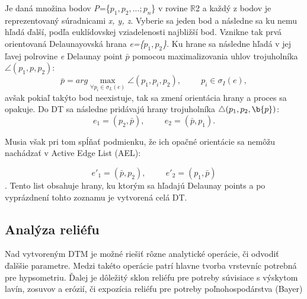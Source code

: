 \documentclass[12pt]{article}
\begin{document}
Je daná množina bodov \textit{P}=\{$p_1, p_2, ...; p_n$\} v rovine $\mathbb{R}$2 a každý z bodov je reprezentovaný súradnicami \textit{x, y, z}. Vyberie sa jeden bod a následne sa ku nemu hľadá ďalší, podľa euklídovskej vziadelenosti najbližší bod. Vznikne tak prvá orientovaná Delaunayovská hrana \textit{e=\{$p_1, p_2$\}}. Ku hrane sa následne hľadá v jej ľavej polrovine \textit{e} Delaunay point $\bar{p}$ pomocou maximalizovania uhlov trojuholníka $\angle(p_1, p, p_2)$:
$$\bar{p} = arg \max\limits_{\forall p_i \in \sigma_L  (e)} \angle(p_1, p_i, p_2),\hspace{1cm}  p_i \in \sigma_I(e),$$ avšak pokiaľ takýto bod neexistuje, tak sa zmení orientácia hrany a proces sa opakuje. Do DT sa následne pridávajú hrany trojuholníka \textit{$\triangle(p_1, p_2, \b{p})$}: 
$$e_1 = (p_2,\bar{p}),\hspace{1cm}  e_2 = (\bar{p}, p_1).$$ \par
 Musia však pri tom spĺňať podmienku, že ich opačné orientácie sa nemôžu nachádzať v Active Edge List (AEL):

$$ e'_1 = (\bar{p}, p_2),\hspace{1cm}  e'_2 = ( p_1, \bar{p})$$.
Tento list obsahuje hrany, ku ktorým sa hľadajú Delaunay points a po vyprázdnení tohto zoznamu je vytvorená celá DT.
\subsection*{Analýza reliéfu}
Nad vytvoreným DTM je možné riešiť rôzne analytické operácie, či odvodiť ďalššie parametre. Medzi takéto operácie patrí hlavne tvorba vrstevníc potrebná pre hypsometriu. Ďalej je dôležitý sklon reliéfu pre potreby súvisiace s výskytom lavín, zosuvov a erózií, či expozícia reliéfu pre potreby poľnohospodárstva (Bayer) 
\end{document}
